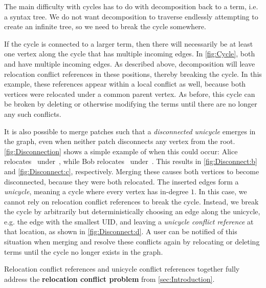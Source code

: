 The main difficulty with cycles has to do with decomposition back to a term, i.e. a syntax tree. We do not want decomposition to traverse endlessly attempting to create an infinite tree, so we need to break the cycle somewhere.

If the cycle is connected to a larger term, then there will necessarily be at least one vertex along the cycle that has multiple incoming edges. In \autoref{fig:Cycle}, both \vMultiCycleTimes{} and \vMultiCyclePlus{} have multiple incoming edges. As described above, decomposition will leave relocation conflict references in these positions, thereby breaking the cycle. In this example, these references appear within a local conflict as well, because both vertices were relocated under a common parent vertex. As before, this cycle can be broken by deleting or otherwise modifying the terms until there are no longer any such conflicts.

It is also possible to merge patches such that a \emph{disconnected unicycle} emerges in the graph, even when neither patch disconnects any vertex from the root. \autoref{fig:Disconnection} shows a simple example of when this could occur: Alice relocates~\vMultiCycleTimes{} under~\vSimpleTimes{},
while Bob relocates~\vSimpleTimes{} under~\vMultiCycleTimes{}. 
This results in \autoref{fig:Disconnect:b} and \autoref{fig:Disconnect:c}, respectively.
Merging these causes both vertices to become disconnected, because they were both relocated. The inserted edges form a \emph{unicycle}, meaning a cycle where every vertex has in-degree $1$. In this case, we cannot rely on relocation conflict references to break the cycle. Instead, we break the cycle by arbitrarily but deterministically choosing an edge along the unicycle, e.g. the edge with the smallest UID, and leaving a \emph{unicycle conflict reference} at that location, as shown in \autoref{fig:Disconnect:d}. A user can be notified of this situation when merging and resolve these conflicts again by relocating or deleting terms until the cycle no longer exists in the graph.

Relocation conflict references and unicycle conflict references together fully address the \textbf{relocation conflict problem} from \autoref{sec:Introduction}.





